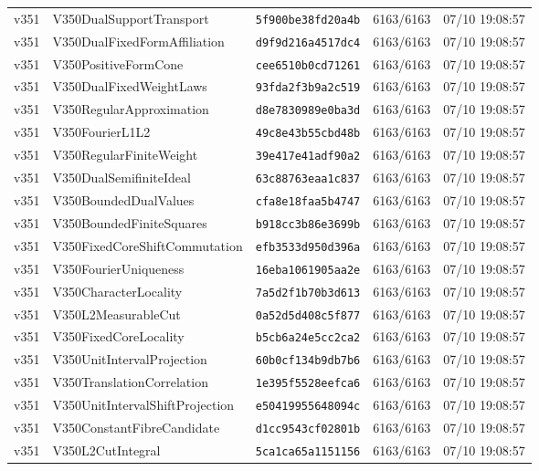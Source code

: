 \documentclass[11pt]{article}
\theoremstyle{definition}\newtheorem{deriv}{Derivation}
\begin{document}
{\begin{longtable}{@{}lllll@{}}
v351 & V350DualSupportTransport & \texttt{5f900be38fd20a4b} & 6163/6163 & 07/10 19:08:57 \\
v351 & V350DualFixedFormAffiliation & \texttt{d9f9d216a4517dc4} & 6163/6163 & 07/10 19:08:57 \\
v351 & V350PositiveFormCone & \texttt{cee6510b0cd71261} & 6163/6163 & 07/10 19:08:57 \\
v351 & V350DualFixedWeightLaws & \texttt{93fda2f3b9a2c519} & 6163/6163 & 07/10 19:08:57 \\
v351 & V350RegularApproximation & \texttt{d8e7830989e0ba3d} & 6163/6163 & 07/10 19:08:57 \\
v351 & V350FourierL1L2 & \texttt{49c8e43b55cbd48b} & 6163/6163 & 07/10 19:08:57 \\
v351 & V350RegularFiniteWeight & \texttt{39e417e41adf90a2} & 6163/6163 & 07/10 19:08:57 \\
v351 & V350DualSemifiniteIdeal & \texttt{63c88763eaa1c837} & 6163/6163 & 07/10 19:08:57 \\
v351 & V350BoundedDualValues & \texttt{cfa8e18faa5b4747} & 6163/6163 & 07/10 19:08:57 \\
v351 & V350BoundedFiniteSquares & \texttt{b918cc3b86e3699b} & 6163/6163 & 07/10 19:08:57 \\
v351 & V350FixedCoreShiftCommutation & \texttt{efb3533d950d396a} & 6163/6163 & 07/10 19:08:57 \\
v351 & V350FourierUniqueness & \texttt{16eba1061905aa2e} & 6163/6163 & 07/10 19:08:57 \\
v351 & V350CharacterLocality & \texttt{7a5d2f1b70b3d613} & 6163/6163 & 07/10 19:08:57 \\
v351 & V350L2MeasurableCut & \texttt{0a52d5d408c5f877} & 6163/6163 & 07/10 19:08:57 \\
v351 & V350FixedCoreLocality & \texttt{b5cb6a24e5cc2ca2} & 6163/6163 & 07/10 19:08:57 \\
v351 & V350UnitIntervalProjection & \texttt{60b0cf134b9db7b6} & 6163/6163 & 07/10 19:08:57 \\
v351 & V350TranslationCorrelation & \texttt{1e395f5528eefca6} & 6163/6163 & 07/10 19:08:57 \\
v351 & V350UnitIntervalShiftProjection & \texttt{e50419955648094c} & 6163/6163 & 07/10 19:08:57 \\
v351 & V350ConstantFibreCandidate & \texttt{d1cc9543cf02801b} & 6163/6163 & 07/10 19:08:57 \\
v351 & V350L2CutIntegral & \texttt{5ca1ca65a1151156} & 6163/6163 & 07/10 19:08:57 \\

\end{longtable}}
\end{document}
